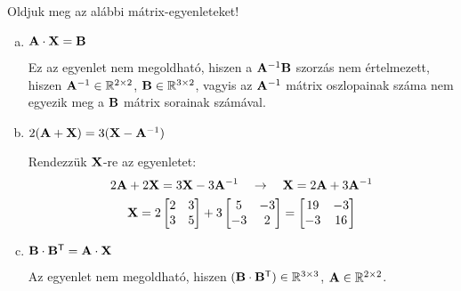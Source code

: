 \begin{exercise}{Oldjuk meg az alábbi mátrix-egyenleteket!}
{\begin{enumerate}[a)]
            \tcbline
      \item $\mathbf{A} \cdot \mathbf{X} = \mathbf{B}$

            Ez az egyenlet nem megoldható, hiszen a $\mathbf{A}^{-1} \mathbf{B}$
            szorzás nem értelmezett, hiszen $\mathbf{A}^{-1} \in
              \mathbb R^{2 \times 2}$, $\mathbf{B} \in \mathbb R^{3 \times 2}$,
            vagyis az $\mathbf{A}^{-1}$ mátrix oszlopainak száma nem egyezik meg
            a $\mathbf{B}$ mátrix sorainak számával.

            \tcbline
      \item $2(\mathbf{A} + \mathbf{X}) = 3(\mathbf{X} - \mathbf{A}^{-1})$

            Rendezzük $\mathbf{X}$-re az egyenletet:
            \begin{gather*}
              2 \mathbf{A} + 2 \mathbf{X} = 3 \mathbf{X} - 3 \mathbf{A}^{-1}
              \quad \rightarrow \quad
              \mathbf{X} = 2 \mathbf{A} + 3 \mathbf{A}^{-1}
              \\
              \mathbf{X} = 2 \begin{bmatrix}
                2 & 3 \\ 3 & 5
              \end{bmatrix} + 3 \begin{bmatrix}
                5 & -3 \\ -3 & 2
              \end{bmatrix} = \begin{bmatrix}
                19 & -3 \\ -3 & 16
              \end{bmatrix}
            \end{gather*}

            \tcbline
      \item $\mathbf{B} \cdot \mathbf{B}^{\mathsf T} = \mathbf{A} \cdot \mathbf{X}$

            Az egyenlet nem megoldható, hiszen $(\mathbf{B} \cdot \mathbf{B}^{\mathsf T})
              \in \mathbb R^{3 \times 3}$, $\mathbf{A} \in \mathbb R^{2 \times 2}$.
    \end{enumerate}
  }
\end{exercise}
